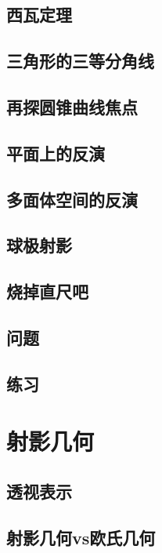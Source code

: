\documentclass[cn,fancy,blue,11pt]{elegantbook}
\begin{document}
\section{西瓦定理}

\section{三角形的三等分角线}

\section{再探圆锥曲线焦点}

\section{平面上的反演}

\section{多面体空间的反演}

\section{球极射影}

\section{烧掉直尺吧}

\section{问题}

\section{练习}

\chapter{射影几何}

\section{透视表示}

\section{射影几何vs欧氏几何}
\end{document}
